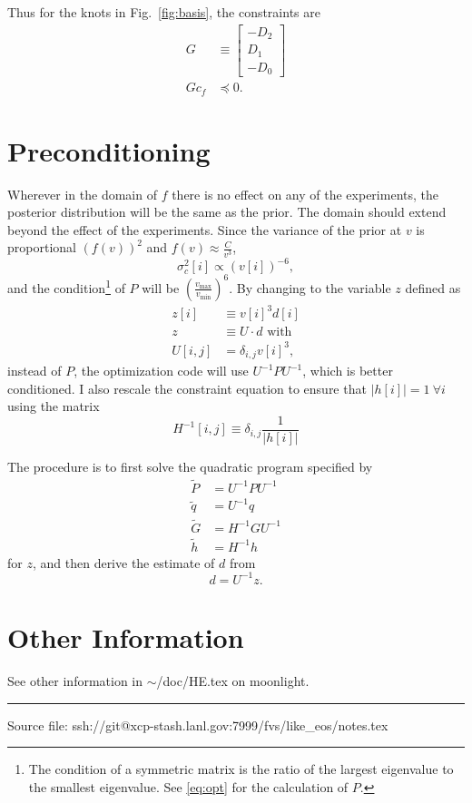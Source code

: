 \documentclass[11pt]{article}
\newcommand{\eos}{f}
\newcommand\cf{c_f}
\begin{document}
Thus for the knots in Fig.~\ref{fig:basis}, the constraints are
\begin{align}
  G & \equiv
      \begin{bmatrix}
        - D_2 \\ D_1 \\ -D_0
      \end{bmatrix}\\
  \label{eq:constraint}
  G\cf & \preceq 0.
\end{align}

\section{Preconditioning}
\label{sec:preconditioning}

Wherever in the domain of $\eos$ there is no effect on any of the
experiments, the posterior distribution will be the same as the prior.
The domain should extend beyond the effect of the experiments.
Since the variance of the prior at $v$ is proportional $(f(v))^2$ and
$f(v) \approx \frac{C}{v^3}$,
\begin{equation}
  \label{eq:var_f}
  \sigma^2_{c}[i] \propto (v[i])^{-6},
\end{equation}
and the condition\footnote{The condition of a symmetric matrix is the
  ratio of the largest eigenvalue to the smallest eigenvalue.  See
  \eqref{eq:opt} for the calculation of $P$.} of $P$ will be
$\left( \frac{v_{\text{max}}}{v_{\text{min}}} \right)^6$.  By
changing to the variable $z$ defined as
\begin{align*}
  z[i] &\equiv v[i]^3 d[i] \\
  z &\equiv U \cdot d \text{ with} \\
  U[i,j] &= \delta_{i,j} v[i]^3,
\end{align*}
\newcommand{\UI}{U^{-1}} instead of $P$, the optimization code will use
$\UI P \UI$, which is better conditioned.  I also rescale the
constraint equation to ensure that $\left| h[i] \right|=1~\forall i$
using the matrix
\begin{equation*}
  H^{-1}[i,j] \equiv \delta_{i,j} \frac{1}{\left|h[i]\right|}
\end{equation*}


The procedure is to first solve the quadratic program specified by
\begin{align*}
  \tilde P &= \UI P \UI \\
  \tilde q &= \UI q \\
  \tilde G &= H^{-1}G \UI \\
  \tilde h &= H^{-1}h
\end{align*}
for $z$, and then derive the estimate of $d$ from
\begin{equation*}
  d = \UI z.
\end{equation*}

\section{Other Information}
\label{sec:appendix}

See other information in $\sim$/doc/HE.tex on moonlight.

 
%
\vfill \hrule

Source file: ssh://git@xcp-stash.lanl.gov:7999/fvs/like\_eos/notes.tex
\end{document}
